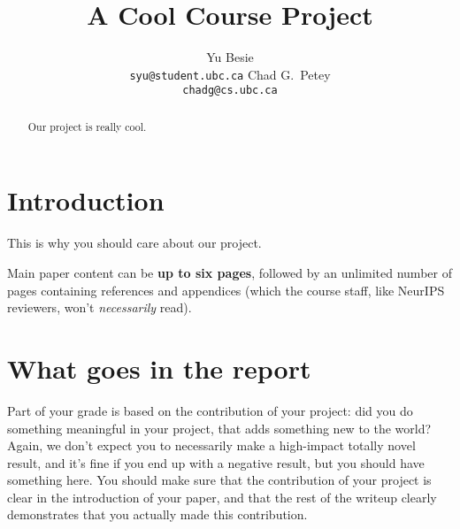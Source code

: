 \documentclass{article}
\title{A Cool Course Project}
\author{%
  Yu Besie\\
  \texttt{syu@student.ubc.ca}
  \And
  Chad G.\ Petey\\
  \texttt{chadg@cs.ubc.ca}
}
\begin{document}
\maketitle


\begin{abstract}
    Our project is really cool.
\end{abstract}


\section{Introduction}

This is why you should care about our project.

Main paper content can be \textbf{up to six pages},
followed by an unlimited number of pages containing references and appendices
(which the course staff, like NeurIPS reviewers, won't \emph{necessarily} read).

\section{What goes in the report}
Part of your grade is based on the contribution of your project:
did you do something meaningful in your project, that adds something new to the world?
Again, we don't expect you to necessarily make a high-impact totally novel result,
and it's fine if you end up with a negative result,
but you should have something here.
You should make sure that the contribution of your project is clear in the introduction of your paper,
and that the rest of the writeup clearly demonstrates that you actually made this contribution.
\end{document}
